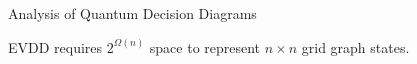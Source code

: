 \begin{refframe}{Analysis of Quantum Decision Diagrams}
\begin{theorem}
EVDD requires $2^{\Omega({{n}})}$ space to represent 
	$ n\times  n$ grid graph states.
\end{theorem}


%
%
%
%
%
%                			  
%    
%    
%

\end{refframe}
